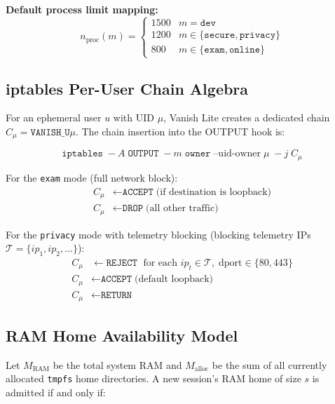 \textbf{Default process limit mapping:}
\begin{equation}
    n_{\text{proc}}(m) = \begin{cases}
        1500 & m = \texttt{dev} \\
        1200 & m \in \{\texttt{secure}, \texttt{privacy}\} \\
        800  & m \in \{\texttt{exam}, \texttt{online}\}
    \end{cases}
    \label{eq:proc_limits}
\end{equation}

\subsection{iptables Per-User Chain Algebra}

For an ephemeral user $u$ with UID $\mu$, Vanish Lite creates a dedicated chain $C_\mu = \texttt{VANISH\_U}\mu$. The chain insertion into the OUTPUT hook is:

\begin{equation}
    \texttt{iptables} \;-A\; \texttt{OUTPUT} \;-m\; \texttt{owner} \;\text{--uid-owner}\; \mu \;-j\; C_\mu
\end{equation}

For the \texttt{exam} mode (full network block):
\begin{align}
    C_\mu &\leftarrow \texttt{ACCEPT}\;\text{(if destination is loopback)} \\
    C_\mu &\leftarrow \texttt{DROP}\;\text{(all other traffic)}
\end{align}

For the \texttt{privacy} mode with telemetry blocking (blocking telemetry IPs $\mathcal{T} = \{ip_1, ip_2, \ldots\}$):
\begin{align}
    C_\mu &\leftarrow \texttt{REJECT}\;\text{ for each } ip_t \in \mathcal{T},\; \text{dport} \in \{80, 443\} \\
    C_\mu &\leftarrow \texttt{ACCEPT}\;\text{(default loopback)} \\
    C_\mu &\leftarrow \texttt{RETURN}
\end{align}

\subsection{RAM Home Availability Model}

Let $M_{\text{RAM}}$ be the total system RAM and $M_{\text{alloc}}$ be the sum of all currently allocated \texttt{tmpfs} home directories. A new session's RAM home of size $s$ is admitted if and only if:

